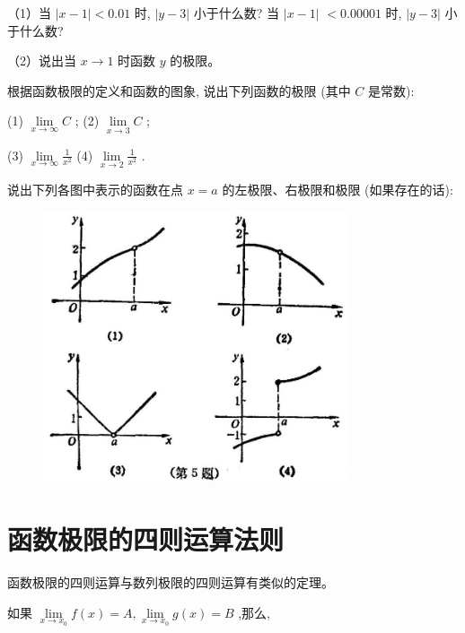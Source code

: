 \documentclass[lang=cn,newtx,12pt,scheme=chinese]{elegantbook}
\begin{document}
\begin{problemset}[练习]
	（1）当 \(\left| {x - 1}\right| < {0.01}\) 时, \(\left| {y - 3}\right|\) 小于什么数? 当 \(\left| {x - 1}\right|\) \(< {0.00001}\) 时, \(\left| {y - 3}\right|\) 小于什么数?
	
	（2）说出当 \(x \rightarrow 1\) 时函数 \(y\) 的极限。
	
	\item 根据函数极限的定义和函数的图象, 说出下列函数的极限 (其中 \(C\) 是常数):
	
	(1) \(\mathop{\lim }\limits_{{x \rightarrow \infty }}C\) ; (2) \(\mathop{\lim }\limits_{{x \rightarrow 3}}C\) ;
	
	(3) \(\mathop{\lim }\limits_{{x \rightarrow \infty }}\frac{1}{{x}^{2}}\) (4) \(\mathop{\lim }\limits_{{x \rightarrow 2}}\frac{1}{{x}^{2}}\) .
	
	\item 说出下列各图中表示的函数在点 \(x = a\) 的左极限、右极限和极限 (如果存在的话):
	
	\begin{figure}[h]
		\centering
		\includegraphics[max width=0.8\textwidth]{images/01912c18-5c3f-733d-b775-749ba9897a9d_27_586841.jpg}
	\end{figure}
	
\end{problemset}

\section{函数极限的四则运算法则}

函数极限的四则运算与数列极限的四则运算有类似的定理。

如果 \(\mathop{\lim }\limits_{{x \rightarrow {x}_{0}}}f\left( x\right) = A,\mathop{\lim }\limits_{{x \rightarrow {x}_{0}}}g\left( x\right) = B\) ,那么,
\end{document}
